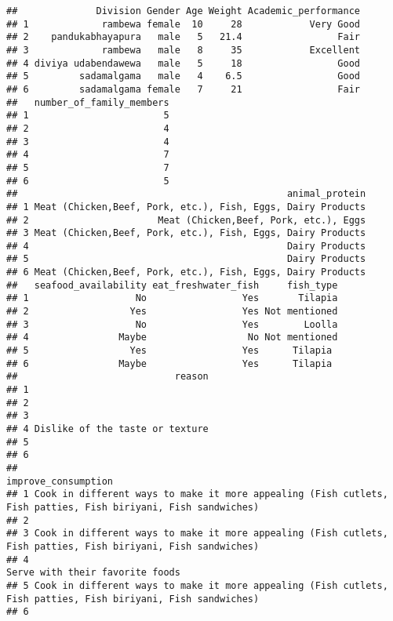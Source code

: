 \documentclass[
]{article}
\begin{document}
\begin{verbatim}
##              Division Gender Age Weight Academic_performance
## 1             rambewa female  10     28            Very Good
## 2    pandukabhayapura   male   5   21.4                 Fair
## 3             rambewa   male   8     35            Excellent
## 4 diviya udabendawewa   male   5     18                 Good
## 5         sadamalgama   male   4    6.5                 Good
## 6         sadamalgama female   7     21                 Fair
##   number_of_family_members
## 1                        5
## 2                        4
## 3                        4
## 4                        7
## 5                        7
## 6                        5
##                                                animal_protein
## 1 Meat (Chicken,Beef, Pork, etc.), Fish, Eggs, Dairy Products
## 2                       Meat (Chicken,Beef, Pork, etc.), Eggs
## 3 Meat (Chicken,Beef, Pork, etc.), Fish, Eggs, Dairy Products
## 4                                              Dairy Products
## 5                                              Dairy Products
## 6 Meat (Chicken,Beef, Pork, etc.), Fish, Eggs, Dairy Products
##   seafood_availability eat_freshwater_fish     fish_type
## 1                   No                 Yes       Tilapia
## 2                  Yes                 Yes Not mentioned
## 3                   No                 Yes        Loolla
## 4                Maybe                  No Not mentioned
## 5                  Yes                 Yes      Tilapia 
## 6                Maybe                 Yes      Tilapia 
##                            reason
## 1                                
## 2                                
## 3                                
## 4 Dislike of the taste or texture
## 5                                
## 6                                
##                                                                                             improve_consumption
## 1 Cook in different ways to make it more appealing (Fish cutlets, Fish patties, Fish biriyani, Fish sandwiches)
## 2                                                                                                              
## 3 Cook in different ways to make it more appealing (Fish cutlets, Fish patties, Fish biriyani, Fish sandwiches)
## 4                                                                               Serve with their favorite foods
## 5 Cook in different ways to make it more appealing (Fish cutlets, Fish patties, Fish biriyani, Fish sandwiches)
## 6                                                                                                              

\end{verbatim}
\end{document}
